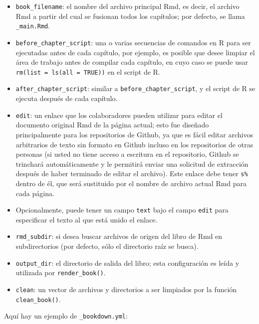 \documentclass[12pt,]{krantz}
\makeatletter
\newenvironment{Shaded}{\begin{snugshade}}{\end{snugshade}}
\newcommand{\KeywordTok}[1]{\textcolor[rgb]{0.13,0.29,0.53}{\textbf{{#1}}}}
\newcommand{\StringTok}[1]{\textcolor[rgb]{0.31,0.60,0.02}{{#1}}}
\newcommand{\FunctionTok}[1]{\textcolor[rgb]{0.00,0.00,0.00}{{#1}}}
\newcommand{\NormalTok}[1]{{#1}}
\newenvironment{kframe}{%
\medskip{}
\setlength{\fboxsep}{.8em}
 \def\at@end@of@kframe{}%
 \ifinner\ifhmode%
  \def\at@end@of@kframe{\end{minipage}}%
  \begin{minipage}{\columnwidth}%
 \fi\fi%
 \def\FrameCommand##1{\hskip\@totalleftmargin \hskip-\fboxsep
 \colorbox{shadecolor}{##1}\hskip-\fboxsep
     \hskip-\linewidth \hskip-\@totalleftmargin \hskip\columnwidth}%
 \MakeFramed {\advance\hsize-\width
   \@totalleftmargin\z@ \linewidth\hsize
   \@setminipage}}%
 {\par\unskip\endMakeFramed%
 \at@end@of@kframe}
\renewenvironment{Shaded}{\begin{kframe}}{\end{kframe}}
\theoremstyle{definition}
\theoremstyle{definition}
\theoremstyle{remark}
\makeatother
\begin{document}
\begin{itemize}
\item
  \texttt{book\_filename}: el nombre del archivo principal Rmd, es
  decir, el archivo Rmd a partir del cual se fusionan todos los
  capítulos; por defecto, se llama \texttt{\_main.Rmd}.
\item
  \texttt{before\_chapter\_script}: una o varias secuencias de comandos
  en R para ser ejecutadas antes de cada capítulo, por ejemplo, es
  posible que desee limpiar el área de trabajo antes de compilar cada
  capítulo, en cuyo caso se puede usar
  \texttt{rm(list\ =\ ls(all\ =\ TRUE))} en el script de R.
\item
  \texttt{after\_chapter\_script}: similar a
  \texttt{before\_chapter\_script}, y el script de R se ejecuta después
  de cada capítulo.
\item
  \texttt{edit}: un enlace que los colaboradores pueden utilizar para
  editar el documento original Rmd de la página actual; esto fue
  diseñado principalmente para los repositorios de Github, ya que es
  fácil editar archivos arbitrarios de texto sin formato en Github
  incluso en los repositorios de otras personas (si usted no tiene
  acceso a escritura en el repositorio, Github se trinchará
  automáticamente y le permitirá enviar una solicitud de extracción
  después de haber terminado de editar el archivo). Este enlace debe
  tener \texttt{s\%} dentro de él, que será sustituido por el nombre de
  archivo actual Rmd para cada página.
\item
  Opcionalmente, puede tener un campo \texttt{text} bajo el campo
  \texttt{edit} para especificar el texto al que está unido el enlace.
\item
  \texttt{rmd\_subdir}: si desea buscar archivos de origen del libro de
  Rmd en subdirectorios (por defecto, sólo el directorio raíz se
  busca).\\
\item
  \texttt{output\_dir}: el directorio de salida del libro; esta
  configuración es leída y utilizada por \texttt{render\_book()}.
\item
  \texttt{clean}: un vector de archivos y directorios a ser limpiados
  por la función \texttt{clean\_book()}.
\end{itemize}

Aquí hay un ejemplo de \texttt{\_bookdown.yml}:

\begin{Shaded}
\end{Shaded}
\end{document}
